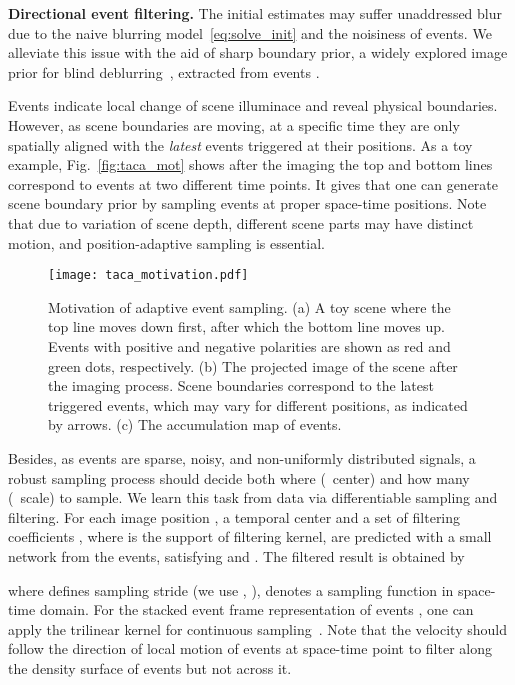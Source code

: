 \documentclass[10pt,twocolumn,letterpaper]{article}
\begin{document}
\textbf{Directional event filtering.}
The initial estimates  may suffer unaddressed blur due to the naive blurring model~\eqref{eq:solve_init} and the noisiness of events. We alleviate this issue with the aid of sharp boundary prior, a widely explored image prior for blind deblurring~\cite{ChoTOG09,XuECCV10}, extracted from events .

Events indicate local change of scene illuminace and reveal physical boundaries. However, as scene boundaries are moving, at a specific time they are only spatially aligned with the \textit{latest} events triggered at their positions. As a toy example, Fig.~\eqref{fig:taca_mot} shows after the imaging the top and bottom lines correspond to events at two different time points. It gives that one can generate scene boundary prior by sampling events at proper space-time positions. Note that due to variation of scene depth, different scene parts may have distinct motion, and position-adaptive sampling is essential.

\begin{figure}[!t]
	\centering
	\texttt{[image: taca\_motivation.pdf]}
	\caption{Motivation of adaptive event sampling. (a) A toy scene where the top line moves down first, after which the bottom line moves up. Events with positive and negative polarities are shown as red and green dots, respectively. (b) The projected image of the scene after the imaging process. Scene boundaries correspond to the latest triggered events, which may vary for different positions, as indicated by arrows. (c) The accumulation map of events.} 
	\label{fig:taca_mot}
\end{figure}

Besides, as events are sparse, noisy, and non-uniformly distributed signals, a robust sampling process should decide both where (\ie~center) and how many (\ie~scale) to sample. We learn this task from data via differentiable sampling and filtering. For each image position , a temporal center  and a set of  filtering coefficients , where  is the support of filtering kernel, are predicted with a small network from the events, satisfying  and  . The filtered result is obtained by

where  defines sampling stride (we use , ),  denotes a sampling function in space-time domain. For the stacked event frame representation of events , one can apply the trilinear kernel for continuous sampling~\cite{LiuZICCV17}. Note that the velocity  should follow the direction of local motion of events at space-time point  to filter along the density surface of events but not across it.
\end{document}
